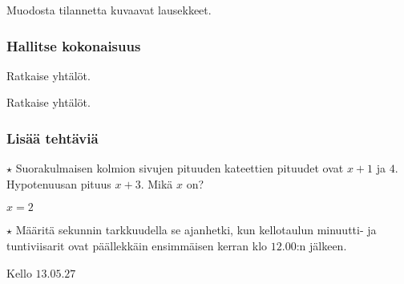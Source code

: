 \begin{tehtavasivu}
\begin{tehtava}
    Muodosta tilannetta kuvaavat lausekkeet.
    \begin{vastaus}
    \end{vastaus}
\end{tehtava}

\subsubsection*{Hallitse kokonaisuus}

\begin{tehtava}
    Ratkaise yhtälöt.
    \begin{vastaus}
    \end{vastaus}
\end{tehtava}

\begin{tehtava}
    Ratkaise yhtälöt.
    \begin{vastaus}
    \end{vastaus}
\end{tehtava}

\subsubsection*{Lisää tehtäviä}

\begin{tehtava}
   $\star$ Suorakulmaisen kolmion sivujen pituuden kateettien pituudet ovat $x+1$ ja $4$. Hypotenuusan pituus $x+3$. Mikä $x$ on?
    \begin{vastaus}
		$x=2$
    \end{vastaus}
\end{tehtava}

\begin{tehtava}
    $\star$ Määritä sekunnin tarkkuudella se ajanhetki, kun kellotaulun minuutti- ja tuntiviisarit ovat päällekkäin ensimmäisen kerran klo $12.00$:n jälkeen.
    \begin{vastaus}
		Kello $13.05.27$
    \end{vastaus}
\end{tehtava}

\end{tehtavasivu}